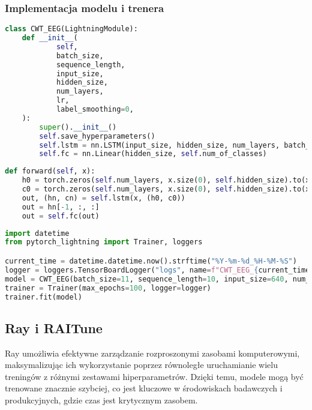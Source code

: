 \documentclass[12pt,twoside]{article}
\begin{document}
    \subsubsection{Implementacja modelu i trenera}

    \begin{lstlisting}[language=Python, caption=Klasa modelu CWT\_EEG]
class CWT_EEG(LightningModule):
    def __init__(
            self,
            batch_size,
            sequence_length,
            input_size,
            hidden_size,
            num_layers,
            lr,
            label_smoothing=0,
    ):
        super().__init__()
        self.save_hyperparameters()
        self.lstm = nn.LSTM(input_size, hidden_size, num_layers, batch_first=True)
        self.fc = nn.Linear(hidden_size, self.num_of_classes)
    \end{lstlisting}

    \begin{lstlisting}[language=Python, caption=Funkcja forward w modelu CWT\_EEG]
def forward(self, x):
    h0 = torch.zeros(self.num_layers, x.size(0), self.hidden_size).to(x.device)
    c0 = torch.zeros(self.num_layers, x.size(0), self.hidden_size).to(x.device)
    out, (hn, cn) = self.lstm(x, (h0, c0))
    out = hn[-1, :, :]
    out = self.fc(out)
    \end{lstlisting}

    \begin{lstlisting}[language=Python, caption=Konfiguracja i uruchomienie trenera w PyTorch Lightning]
import datetime
from pytorch_lightning import Trainer, loggers

current_time = datetime.datetime.now().strftime("%Y-%m-%d_%H-%M-%S")
logger = loggers.TensorBoardLogger("logs", name=f"CWT_EEG_{current_time}")
model = CWT_EEG(batch_size=11, sequence_length=10, input_size=640, num_layers=3, hidden_size=100, lr=0.001).to(device)
trainer = Trainer(max_epochs=100, logger=logger)
trainer.fit(model)
    \end{lstlisting}

    \subsection{Ray i RAITune}
    Ray umożliwia efektywne zarządzanie rozproszonymi zasobami komputerowymi, maksymalizując ich wykorzystanie poprzez
    równoległe uruchamianie wielu treningów z różnymi zestawami hiperparametrów. Dzięki temu, modele mogą być trenowane
    znacznie szybciej, co jest kluczowe w środowiskach badawczych i produkcyjnych, gdzie czas jest krytycznym zasobem.
\end{document}
